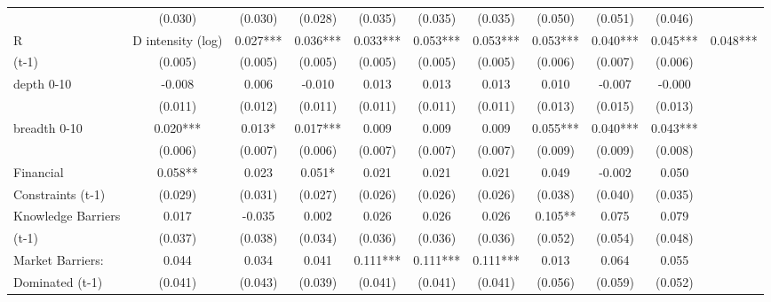 \begin{table}[htbp]
\begin{tabular}{l*{9}{c}}
                    &     (0.030)   &     (0.030)   &     (0.028)   &     (0.035)   &     (0.035)   &     (0.035)   &     (0.050)   &     (0.051)   &     (0.046)   \\
R&D intensity (log) &       0.027***&       0.036***&       0.033***&       0.053***&       0.053***&       0.053***&       0.040***&       0.045***&       0.048***\\
(t-1)               &     (0.005)   &     (0.005)   &     (0.005)   &     (0.005)   &     (0.005)   &     (0.005)   &     (0.006)   &     (0.007)   &     (0.006)   \\
depth 0-10          &      -0.008   &       0.006   &      -0.010   &       0.013   &       0.013   &       0.013   &       0.010   &      -0.007   &      -0.000   \\
                    &     (0.011)   &     (0.012)   &     (0.011)   &     (0.011)   &     (0.011)   &     (0.011)   &     (0.013)   &     (0.015)   &     (0.013)   \\
breadth 0-10        &       0.020***&       0.013*  &       0.017***&       0.009   &       0.009   &       0.009   &       0.055***&       0.040***&       0.043***\\
                    &     (0.006)   &     (0.007)   &     (0.006)   &     (0.007)   &     (0.007)   &     (0.007)   &     (0.009)   &     (0.009)   &     (0.008)   \\
Financial           &       0.058** &       0.023   &       0.051*  &       0.021   &       0.021   &       0.021   &       0.049   &      -0.002   &       0.050   \\
Constraints (t-1)   &     (0.029)   &     (0.031)   &     (0.027)   &     (0.026)   &     (0.026)   &     (0.026)   &     (0.038)   &     (0.040)   &     (0.035)   \\
Knowledge Barriers  &       0.017   &      -0.035   &       0.002   &       0.026   &       0.026   &       0.026   &       0.105** &       0.075   &       0.079   \\
(t-1)               &     (0.037)   &     (0.038)   &     (0.034)   &     (0.036)   &     (0.036)   &     (0.036)   &     (0.052)   &     (0.054)   &     (0.048)   \\
Market Barriers:    &       0.044   &       0.034   &       0.041   &       0.111***&       0.111***&       0.111***&       0.013   &       0.064   &       0.055   \\
Dominated (t-1)     &     (0.041)   &     (0.043)   &     (0.039)   &     (0.041)   &     (0.041)   &     (0.041)   &     (0.056)   &     (0.059)   &     (0.052)   \\

\end{tabular}
\end{table}
